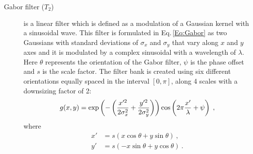 \begin{description}
\item[Gabor filter ($T_{2}$)] is a linear filter which is defined as a modulation of a Gaussian kernel with a sinusoidal wave. 
This filter is formulated in Eq.\,\eqref{Eq:Gabor} as two Gaussians with standard deviations of $\sigma_{x}$ and $\sigma_{y}$ that vary along $x$ and $y$ axes and it is modulated by a complex sinusoidal with a wavelength of $\lambda$. 
Here $\theta$ represents the orientation of the Gabor filter, $\psi$ is the phase offset and $s$ is the scale factor. 
The filter bank is created using six different orientations equally spaced in the interval $[0, \pi]$, along 4 scales with a downsizing factor of 2:
\begin{equation}\scriptsize
  \label{Eq:Gabor}
  g(x,y) = \exp{ \left(-\left( \frac{x'^{2}}{2\sigma_{x}^{2}}+\frac{y'^{2}}{2\sigma_{y}^{2}} \right) \right)} \cos\left( 2\pi\frac{x'}{\lambda}+\psi \right) \ , 
\end{equation}
\noindent where
\begin{align*}
  x' &= s\left( x\cos\theta+y\sin\theta\right) \ ,  \\
  y' &= s\left( -x\sin\theta +y\cos\theta\right) \ .
\end{align*}

\end{description}



